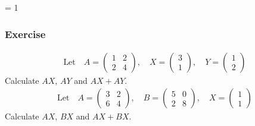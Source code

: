 \documentclass[usenames,dvipsnames,aspectratio=169,10pt]{beamer}
\def \EXAMPLEVERSION {3} %
\numberwithin{equation}{section}
\begin{document}
\ifnum \EXAMPLEVERSION = 1
\begin{frame}
\frametitle{Exercise}
\centering
\begin{align*}
\text{Let} \quad 
A = \begin{pmatrix} 1 & 2 \\ 2 & 4 \end{pmatrix},
\quad
X = \begin{pmatrix} 3 \\ 1 \end{pmatrix},
\quad
Y = \begin{pmatrix} 1 \\ 2 \end{pmatrix}
\end{align*}
Calculate $AX$, $AY$ and $AX+AY$. \\


\begin{align*}
\text{Let} \quad 
A = \begin{pmatrix} 3 & 2 \\ 6 & 4 \end{pmatrix},
\quad
B = \begin{pmatrix} 5 & 0 \\ 2 & 8 \end{pmatrix},
\quad
X = \begin{pmatrix} 1 \\ 1 \end{pmatrix}
\end{align*}
Calculate $AX$, $BX$ and $AX+BX$.
\end{frame}
\fi 
\end{document}

